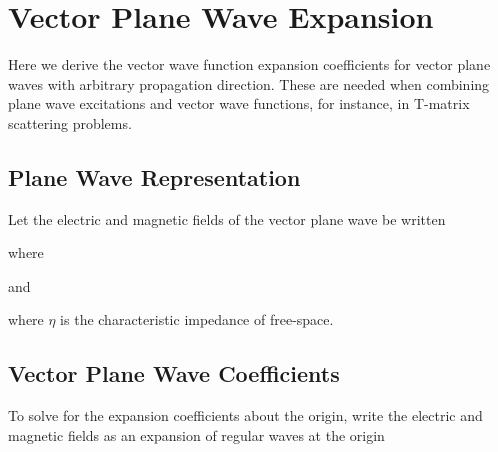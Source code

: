 {\footnotesize
{}
}


\section{Vector Plane Wave Expansion}

Here we derive the vector wave function expansion coefficients for vector plane waves with arbitrary propagation direction. These are needed when combining plane wave excitations and vector wave functions, for instance, in T-matrix scattering problems.

\subsection{Plane Wave Representation}

Let the electric and magnetic fields of the vector plane wave be written



\noindent where

and 

\noindent where $\eta$ is the characteristic impedance of free-space.


\subsection{Vector Plane Wave Coefficients}

To solve for the expansion coefficients about the origin, write the electric and magnetic fields as an expansion of regular waves at the origin


